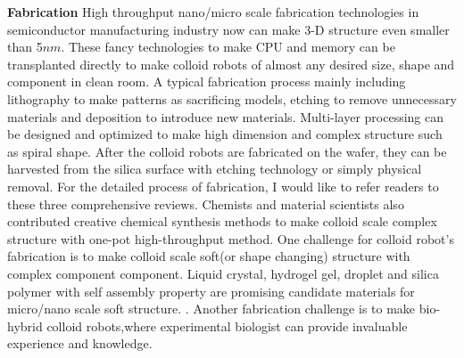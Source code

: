 \textbf{Fabrication}  High throughput nano/micro scale fabrication technologies in semiconductor manufacturing industry now can make 3-D structure even smaller than 5$nm$.\cite{mokhlesi2010three} These fancy technologies to make CPU and memory can be transplanted directly to make colloid robots of almost any desired size, shape and component in clean room.\cite{koman2018colloidal} A typical fabrication process mainly including lithography to make patterns as sacrificing models, etching to remove unnecessary materials and deposition to introduce new materials. Multi-layer processing can be designed and optimized to make high dimension and complex structure such as spiral shape\cite{zhang2009artificial}. After the colloid robots are fabricated on the wafer, they can be harvested from the silica surface with etching technology or simply physical removal. For the detailed process of fabrication, I would like to refer readers to these three comprehensive reviews\cite{wong2016synthetic,wang2017emerging, zha2018tubular}. Chemists and material scientists also contributed creative chemical synthesis methods to make colloid scale complex structure with one-pot high-throughput method\cite{youssef2016shape,gong2017patchy,wang2019active}. One challenge for colloid robot's fabrication is to   make  colloid scale soft(or shape changing) structure with complex component component. Liquid crystal, hydrogel gel, droplet and silica polymer with self assembly property are promising candidate materials for micro/nano scale soft structure. \cite{leong2009tetherless,denkov2015self,zhang2017printing,wei2019molecular}. Another fabrication challenge is to make bio-hybrid colloid robots,where experimental biologist can provide invaluable experience and knowledge.\cite{stanton2016biohybrid,magdanz2013development}

